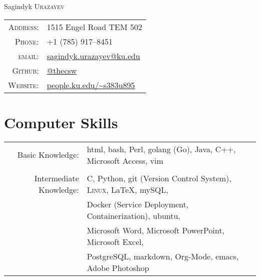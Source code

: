 \documentclass[a4paper,10pt]{article}
\begin{document}
\pagestyle{empty} %

\par{\centering
		{\Huge Sagindyk \textsc{Urazayev}
	}\bigskip\par}

      \begin{center}
        \begin{tabular}{rl}
          \textsc{Address:}   & 1515 Engel Road TEM 502 \\
          \textsc{Phone:}     & +1 (785) 917--8451\\
          \textsc{email:}     & \href{mailto:sagindyk.urazayev@ku.edu}{sagindyk.urazayev@ku.edu}\\
          \textsc{Github:} & \href{https://github.com/thecsw}{@thecsw}\\
          \textsc{Website:} & \href{http://people.ku.edu/~s383u895}{people.ku.edu/\textasciitilde{}s383u895}\\
        \end{tabular}
      \end{center}

\section{Computer Skills}
\begin{tabular}{rl}

  Basic Knowledge:& html, bash, Perl, golang (Go), Java, C++, Microsoft Access, vim\\\\
  
  Intermediate Knowledge:& C, Python, git (Version Control System), \textsc{Linux}, \LaTeX, mySQL,\\&Docker (Service Deployment, Containerization), ubuntu,\\&
  Microsoft Word, Microsoft PowerPoint, Microsoft Excel,\\&PostgreSQL, markdown, Org-Mode, emacs, Adobe Photoshop\\
  
\end{tabular}
\end{document}
